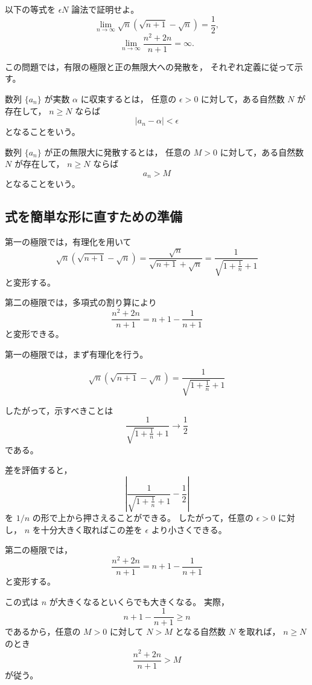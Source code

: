 \begin{exercise}
	以下の等式を $\epsilon N$ 論法で証明せよ。
	\[
		\lim_{n\to\infty}
		\sqrt{n}\left(\sqrt{n+1}-\sqrt{n}\right)
		=
		\frac{1}{2},
	\]
	\[
		\lim_{n\to\infty}
		\frac{n^2+2n}{n+1}
		=
		\infty.
	\]
\end{exercise}
\begin{background}
	この問題では，有限の極限と正の無限大への発散を，
	それぞれ定義に従って示す。

	\begin{definition}[数列の収束]
		数列 $\{a_n\}$ が実数 $\alpha$ に収束するとは，
		任意の $\epsilon>0$ に対して，ある自然数 $N$ が存在して，
		$n\geq N$ ならば
		\[
			|a_n-\alpha|<\epsilon
		\]
		となることをいう。
	\end{definition}

	\begin{definition}[正の無限大への発散]
		数列 $\{a_n\}$ が正の無限大に発散するとは，
		任意の $M>0$ に対して，ある自然数 $N$ が存在して，
		$n\geq N$ ならば
		\[
			a_n>M
		\]
		となることをいう。
	\end{definition}

	\subsection{式を簡単な形に直すための準備}

	\begin{remark}
		第一の極限では，有理化を用いて
		\[
			\sqrt{n}(\sqrt{n+1}-\sqrt{n})
			=
			\frac{\sqrt{n}}{\sqrt{n+1}+\sqrt{n}}
			=
			\frac{1}{\sqrt{1+\frac{1}{n}}+1}
		\]
		と変形する。

		第二の極限では，多項式の割り算により
		\[
			\frac{n^2+2n}{n+1}
			=
			n+1-\frac{1}{n+1}
		\]
		と変形できる。
	\end{remark}
\end{background}
\begin{strategy}
	第一の極限では，まず有理化を行う。

	\[
		\sqrt{n}(\sqrt{n+1}-\sqrt{n})
		=
		\frac{1}{\sqrt{1+\frac{1}{n}}+1}
	\]

	したがって，示すべきことは
	\[
		\frac{1}{\sqrt{1+\frac{1}{n}}+1}
		\to
		\frac{1}{2}
	\]
	である。

	差を評価すると，
	\[
		\left|
			\frac{1}{\sqrt{1+\frac{1}{n}}+1}
			-
			\frac{1}{2}
		\right|
	\]
	を $1/n$ の形で上から押さえることができる。
	したがって，任意の $\epsilon>0$ に対し，
	$n$ を十分大きく取ればこの差を $\epsilon$ より小さくできる。

	第二の極限では，
	\[
		\frac{n^2+2n}{n+1}
		=
		n+1-\frac{1}{n+1}
	\]
	と変形する。

	この式は $n$ が大きくなるといくらでも大きくなる。
	実際，
	\[
		n+1-\frac{1}{n+1}\geq n
	\]
	であるから，任意の $M>0$ に対して $N>M$ となる自然数 $N$ を取れば，
	$n\geq N$ のとき
	\[
		\frac{n^2+2n}{n+1}>M
	\]
	が従う。
\end{strategy}